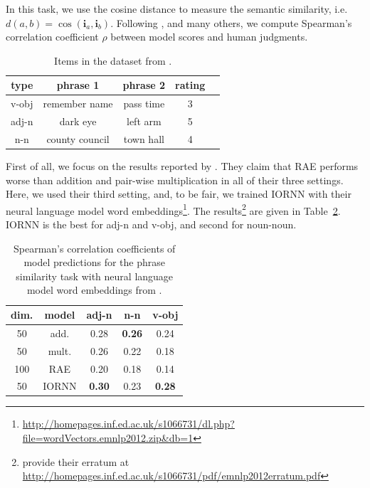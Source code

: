 \documentclass[11pt]{article}
\begin{document}
In this task, we use the cosine distance to measure the semantic similarity, 
i.e. $d(a,b) = \cos(\mathbf{i}_a,\mathbf{i}_b)$. Following , 
 and many others, we compute Spearman's correlation coefficient $\rho$
between model scores and human judgments.


\begin{table}[h!]
	\center
	\begin{tabular}{ccccc}
		type & phrase 1 & phrase 2 & rating \\ \hline 
		v-obj & remember name &  pass time & 3 \\ 
		adj-n & dark eye & left arm & 5 \\ 
		n-n & county council & town hall & 4 \\ \hline
	\end{tabular}
	\caption{Items in the dataset from .}
	\label{table compounds}
\end{table}	

First of all, we focus on the results reported by . They 
claim that RAE performs worse than addition and pair-wise multiplication in all of their three settings. 
Here, we used their third setting, and, to be fair, we trained IORNN with their neural language model word embeddings\footnote{\url{http://homepages.inf.ed.ac.uk/s1066731/dl.php?file=wordVectors.emnlp2012.zip&db=1}}.
The results\footnote{ provide their erratum at \url{http://homepages.inf.ed.ac.uk/s1066731/pdf/emnlp2012erratum.pdf}} 
are given in Table~\ref{table blacoe}. IORNN is the best for adj-n and v-obj, and second for noun-noun.
\begin{table}[h!]
	\center
	\begin{tabular}{ccccc}
		dim. & model & adj-n & n-n & v-obj \\ \hline 
		50 & add. & 0.28 & \textbf{0.26} & 0.24 \\ 
		50 & mult. & 0.26 & 0.22 & 0.18 \\ 
		100 & RAE & 0.20 & 0.18 & 0.14 \\ \hline
		50 & IORNN & \textbf{0.30} & 0.23 & \textbf{0.28} \\ \hline
	\end{tabular}
	\caption{Spearman's correlation coefficients of model predictions for the phrase similarity task
	with neural language model word embeddings from .}
	\label{table blacoe}
\end{table}
\end{document}

